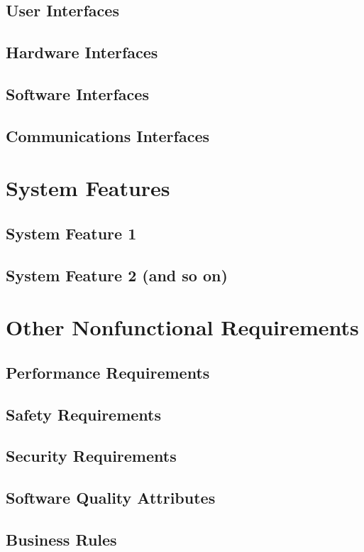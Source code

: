 \documentclass{scrreprt}
\begin{document}
\section{User Interfaces}
\section{Hardware Interfaces}
\section{Software Interfaces}
\section{Communications Interfaces}
\chapter{System Features}

\section{System Feature 1}


\section{System Feature 2 (and so on)}


\chapter{Other Nonfunctional Requirements}

\section{Performance Requirements}
\section{Safety Requirements}
\section{Security Requirements}


\section{Software Quality Attributes}


\section{Business Rules}
\end{document}
